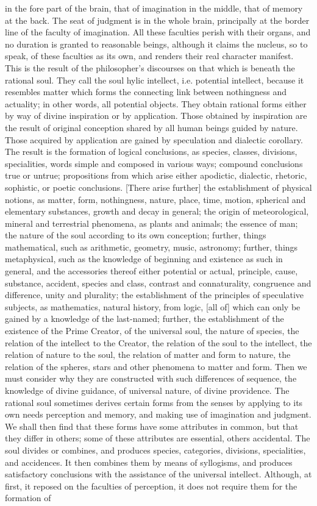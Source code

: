 \documentclass[12pt]{article}
\begin{document}
in the fore part of the brain, that of imagination in the middle, that of memory at the back. The seat of judgment is in the whole brain, principally at the border line of the faculty of imagination. All these faculties perish with their organs, and no duration is granted to reasonable beings, although it claims the nucleus, so to speak, of these faculties as its own, and renders their real character manifest. This is the result of the philosopher's discourses on that which is beneath the rational soul. They call the soul hylic intellect, i.e. potential intellect, because it resembles matter which forms the connecting link between nothingness and actuality; in other words, all potential objects. They obtain rational forms either by way of divine inspiration or by application. Those obtained by inspiration are the result of original conception shared by all human beings guided by nature. Those acquired by application are gained by speculation and dialectic corollary. The result is the formation of logical conclusions, as species, classes, divisions, specialities, words simple and composed in various ways; compound conclusions true or untrue; propositions from which arise either apodictic, dialectic, rhetoric, sophistic, or poetic conclusions. [There arise further] the establishment of physical notions, as matter, form, nothingness, nature, place, time, motion, spherical and elementary substances, growth and decay in general; the origin of meteorological, mineral and terrestrial phenomena, as plants and animals; the essence of man; the nature of the soul according to its own conception; further, things mathematical, such as arithmetic, geometry, music, astronomy; further, things metaphysical, such as the knowledge of beginning and existence as such in general, and the accessories thereof either potential or actual, principle, cause, substance, accident, species and class, contrast and connaturality, congruence and difference, unity and plurality; the establishment of the principles of speculative subjects, as mathematics, natural history, from logic, [all of] which can only be gained by a knowledge of the last-named; further, the establishment of the existence of the Prime Creator, of the universal soul, the nature of species, the relation of the intellect to the Creator, the relation of the soul to the intellect, the relation of nature to the soul, the relation of matter and form to nature, the relation of the spheres, stars and other phenomena to matter and form. Then we must consider why they are constructed with such differences of sequence, the knowledge of divine guidance, of universal nature, of divine providence. The rational soul sometimes derives certain forms from the senses by applying to its own needs perception and memory, and making use of imagination and judgment. We shall then find that these forms have some attributes in common, but that they differ in others; some of these attributes are essential, others accidental. The soul divides or combines, and produces species, categories, divisions, specialities, and accidences. It then combines them by means of syllogisms, and produces satisfactory conclusions with the assistance of the universal intellect. Although, at first, it reposed on the faculties of perception, it does not require them for the formation of 
\end{document}
